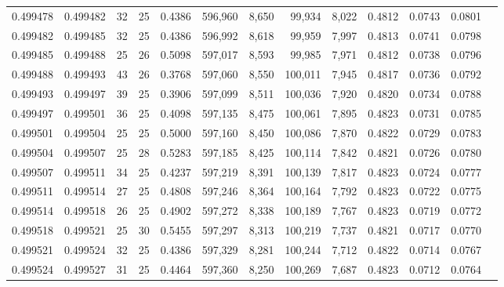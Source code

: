 \begin{tabular}{rrrrrrrrrrrrr}
0.499478 & 0.499482 &    32 &  25 &                                     0.4386 & 596,960 &   8,650 &  99,934 &   8,022 & 0.4812 & 0.0743 & 0.0801 \\
0.499482 & 0.499485 &    32 &  25 &                                     0.4386 & 596,992 &   8,618 &  99,959 &   7,997 & 0.4813 & 0.0741 & 0.0798 \\
0.499485 & 0.499488 &    25 &  26 &                                     0.5098 & 597,017 &   8,593 &  99,985 &   7,971 & 0.4812 & 0.0738 & 0.0796 \\
0.499488 & 0.499493 &    43 &  26 &                                     0.3768 & 597,060 &   8,550 & 100,011 &   7,945 & 0.4817 & 0.0736 & 0.0792 \\
0.499493 & 0.499497 &    39 &  25 &                                     0.3906 & 597,099 &   8,511 & 100,036 &   7,920 & 0.4820 & 0.0734 & 0.0788 \\
0.499497 & 0.499501 &    36 &  25 &                                     0.4098 & 597,135 &   8,475 & 100,061 &   7,895 & 0.4823 & 0.0731 & 0.0785 \\
0.499501 & 0.499504 &    25 &  25 &                                     0.5000 & 597,160 &   8,450 & 100,086 &   7,870 & 0.4822 & 0.0729 & 0.0783 \\
0.499504 & 0.499507 &    25 &  28 &                                     0.5283 & 597,185 &   8,425 & 100,114 &   7,842 & 0.4821 & 0.0726 & 0.0780 \\
0.499507 & 0.499511 &    34 &  25 &                                     0.4237 & 597,219 &   8,391 & 100,139 &   7,817 & 0.4823 & 0.0724 & 0.0777 \\
0.499511 & 0.499514 &    27 &  25 &                                     0.4808 & 597,246 &   8,364 & 100,164 &   7,792 & 0.4823 & 0.0722 & 0.0775 \\
0.499514 & 0.499518 &    26 &  25 &                                     0.4902 & 597,272 &   8,338 & 100,189 &   7,767 & 0.4823 & 0.0719 & 0.0772 \\
0.499518 & 0.499521 &    25 &  30 &                                     0.5455 & 597,297 &   8,313 & 100,219 &   7,737 & 0.4821 & 0.0717 & 0.0770 \\
0.499521 & 0.499524 &    32 &  25 &                                     0.4386 & 597,329 &   8,281 & 100,244 &   7,712 & 0.4822 & 0.0714 & 0.0767 \\
0.499524 & 0.499527 &    31 &  25 &                                     0.4464 & 597,360 &   8,250 & 100,269 &   7,687 & 0.4823 & 0.0712 & 0.0764 \\

\end{tabular}
